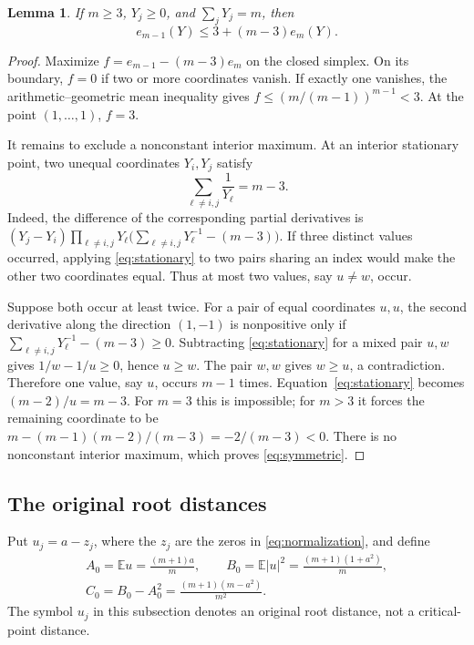 \documentclass[11pt,reqno]{amsart}
\newtheorem{lem}[thm]{Lemma}
\theoremstyle{definition}
\theoremstyle{remark}
\numberwithin{equation}{section}
\newcommand{\E}{\mathbb E}
\begin{document}
\begin{lem}\label{lem:symmetric}
If $m\ge3$, $Y_j\ge0$, and $\sum_jY_j=m$, then
\begin{equation}\label{eq:symmetric}
 e_{m-1}(Y)\le3+(m-3)e_m(Y).
\end{equation}
\end{lem}
\begin{proof}
Maximize $f=e_{m-1}-(m-3)e_m$ on the closed simplex. On its boundary, $f=0$ if two or more coordinates vanish. If exactly one vanishes, the arithmetic--geometric mean inequality gives $f\le(m/(m-1))^{m-1}<3$. At the point $(1,\ldots,1)$, $f=3$.

It remains to exclude a nonconstant interior maximum. At an interior stationary point, two unequal coordinates $Y_i,Y_j$ satisfy
\begin{equation}\label{eq:stationary}
 \sum_{\ell\ne i,j}\frac1{Y_\ell}=m-3.
\end{equation}
Indeed, the difference of the corresponding partial derivatives is
$(Y_j-Y_i)\prod_{\ell\ne i,j}Y_\ell\bigl(\sum_{\ell\ne i,j}Y_\ell^{-1}-(m-3)\bigr)$.
If three distinct values occurred, applying \eqref{eq:stationary} to two pairs sharing an index would make the other two coordinates equal. Thus at most two values, say $u\ne w$, occur.

Suppose both occur at least twice. For a pair of equal coordinates $u,u$, the second derivative along the direction $(1,-1)$ is nonpositive only if
$\sum_{\ell\ne i,j}Y_\ell^{-1}-(m-3)\ge0$.
Subtracting \eqref{eq:stationary} for a mixed pair $u,w$ gives $1/w-1/u\ge0$, hence $u\ge w$. The pair $w,w$ gives $w\ge u$, a contradiction. Therefore one value, say $u$, occurs $m-1$ times. Equation~\eqref{eq:stationary} becomes $(m-2)/u=m-3$. For $m=3$ this is impossible; for $m>3$ it forces the remaining coordinate to be $m-(m-1)(m-2)/(m-3)=-2/(m-3)<0$. There is no nonconstant interior maximum, which proves \eqref{eq:symmetric}.
\end{proof}

\subsection{The original root distances}

Put $u_j=a-z_j$, where the $z_j$ are the zeros in \eqref{eq:normalization}, and define
\begin{equation}\label{eq:ABC}
 \begin{gathered}
 A_0=\E u=\frac{(m+1)a}{m},\qquad
 B_0=\E|u|^2=\frac{(m+1)(1+a^2)}m,\\
 C_0=B_0-A_0^2=\frac{(m+1)(m-a^2)}{m^2}.
 \end{gathered}
\end{equation}
The symbol $u_j$ in this subsection denotes an original root distance, not a critical-point distance.
\end{document}
